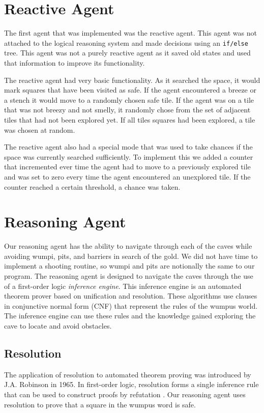 \documentclass{article}
\begin{document}
\section{Reactive Agent}
The first agent that was implemented was the reactive agent.
 This agent was not attached to the logical reasoning system and made decisions using an \texttt{if/else} tree.
  This agent was not a purely reactive agent as it saved old states and used that information to improve its functionality\cite{reactive}.
  

The reactive agent had very basic functionality.
 As it searched the space, it would mark squares that have been visited as safe.
  If the agent encountered a breeze or a stench it would move to a randomly chosen safe tile.
   If the agent was on a tile that was not breezy and not smelly, it randomly chose from the set of adjacent tiles that had not been explored yet.
    If all tiles squares had been explored, a tile was chosen at random.

The reactive agent also had a special mode that was used to take chances if the space was currently searched sufficiently.
 To implement this we added a counter that incremented ever time the agent had to move to a previously explored tile and was set to zero every time the agent encountered an unexplored tile.
  If the counter reached a certain threshold, a chance was taken.

\section{Reasoning Agent}
Our reasoning agent has the ability to navigate through each of the caves while avoiding wumpi, pits, and barriers in search of the gold. We did not have time to implement a shooting routine, so wumpi and pits are notionally the same to our program. The reasoning agent is designed to navigate the caves through the use of a first-order logic \textit{inference engine}. This inference engine is an automated theorem prover based on unification and resolution. These algorithms use clauses in conjunctive normal form (CNF) that represent the rules of the wumpus world. The inference engine can use these rules and the knowledge gained exploring the cave to locate and avoid obstacles.

\subsection{Resolution}
The application of resolution to automated theorem proving was introduced by J.A. Robinson in 1965.
In first-order logic, resolution forms a single inference rule that can be used to construct proofs by refutation \cite{robinson}. 
Our reasoning agent uses resolution to prove that a square in the wumpus word is safe.
\end{document}
